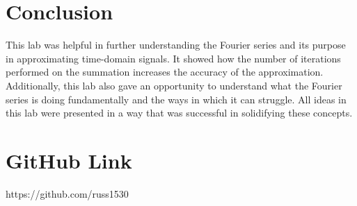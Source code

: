 \documentclass[12pt, titlepage]{article}
\begin{document}
    \clearpage
    \section{Conclusion}
    This lab was helpful in further understanding the Fourier series and its purpose in approximating time-domain signals.  It showed how the number of iterations performed on the summation increases the accuracy of the approximation.  Additionally, this lab also gave an opportunity to understand what the Fourier series is doing fundamentally and the ways in which it can struggle. All ideas in this lab were presented in a way that was successful in solidifying these concepts.
   
    \section{GitHub Link}
        https://github.com/russ1530
\end{document}

